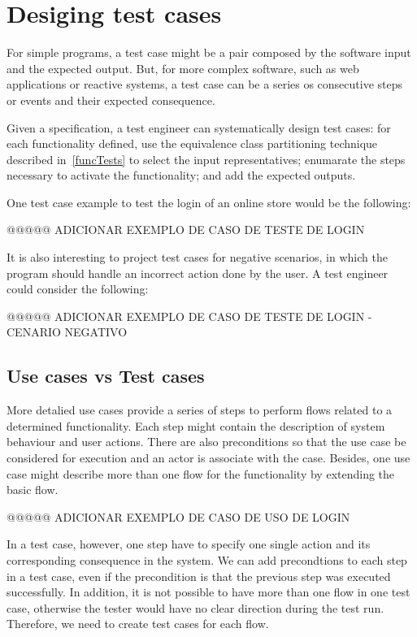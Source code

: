 \section{Desiging test cases}
\label{sec:testcasesdesign}

For simple programs, a test case might be a pair composed by the software input and the expected output. But, for more complex software, such as web applications or reactive systems, a test case can be a series os consecutive steps or events and their expected consequence.

Given a specification, a test engineer can systematically design test cases: for each functionality defined, use the equivalence class partitioning technique described in~\ref{funcTests} to select the input representatives; enumarate the steps necessary to activate the functionality; and add the expected outputs.

One test case example to test the login of an online store would be the following:

@@@@@ ADICIONAR EXEMPLO DE CASO DE TESTE DE LOGIN

It is also interesting to project test cases for negative scenarios, in which the program should handle an incorrect action done by the user. A test engineer could consider the following:

@@@@@ ADICIONAR EXEMPLO DE CASO DE TESTE DE LOGIN - CENARIO NEGATIVO

\subsection{Use cases vs Test cases}

More detalied use cases provide a series of steps to perform flows related to a determined functionality. Each step might contain the description of system behaviour and user actions. There are also preconditions so that the use case be considered for execution and an actor is associate with the case. Besides, one use case might describe more than one flow for the functionality by extending the basic flow. 

@@@@@ ADICIONAR EXEMPLO DE CASO DE USO DE LOGIN

In a test case, however, one step have to specify one single action and its corresponding consequence in the system. We can add precondtions to each step in a test case, even if the precondition is that the previous step was executed successfully. In addition, it is not possible to have more than one flow in one test case, otherwise the tester would have no clear direction during the test run. Therefore, we need to create test cases for each flow.

